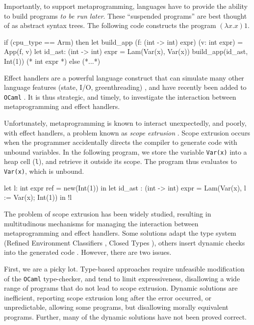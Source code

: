 Importantly, to support metaprogramming, languages have to provide the ability to build programs \textit{to be run later}. These ``suspended programs'' are best thought of as abstract syntax trees. The following code constructs the program $(\lambda x. x) 1$.
\begin{ocaml}
if (cpu_type == Arm) then 
  let build_app (f: (int -> int) expr) (v: int expr) = App(f, v)
  let id_ast: (int -> int) expr = Lam(Var(x), Var(x))
  build_app(id_ast, Int(1)) (* int expr *)
else 
  (*...*)
\end{ocaml}

Effect handlers are a powerful language construct that can simulate many other language features (state, I/O, greenthreading) \citep{pretnar-15}, and have recently been added to \texttt{OCaml} \citep{sivaramakrishnan-21}.  It is thus strategic, and timely, to investigate the interaction between metaprogramming and effect handlers. 

Unfortunately, metaprogramming is known to interact unexpectedly, and poorly, with effect handlers, a problem known as \textit{scope extrusion} \citep{kiselyov-14}. Scope extrusion occurs when the programmer accidentally directs the compiler to generate code with unbound variables. In the following program, we store the variable \texttt{Var(x)} into a heap cell (\texttt{l}), and retrieve it outside its scope. The program thus evaluates to \texttt{Var(x)}, which is unbound.

\begin{ocaml}
let l: int expr ref = new(Int(1)) in 
let id_ast : (int -> int) expr = Lam(Var(x), l := Var(x); Int(1)) in
!l
\end{ocaml} 

The problem of scope extrusion has been widely studied, resulting in multitudinous mechanisms for managing the interaction between metaprogramming and effect handlers. Some solutions adapt the type system (Refined Environment Classifiers \citep{kiselyov-16,isoda-24}, Closed Types \citep{calcagno-00}), others insert dynamic checks into the generated code \citep{kiselyov-14}. However, there are two issues.

First, we are a picky lot. Type-based approaches require unfeasible modification of the \texttt{OCaml} type-checker, and tend to limit expressiveness, disallowing a wide range of programs that do not lead to scope extrusion. Dynamic solutions are inefficient, reporting scope extrusion long after the error occurred, or unpredictable, allowing some programs, but disallowing morally equivalent programs. Further, many of the dynamic solutions have not been proved correct.

